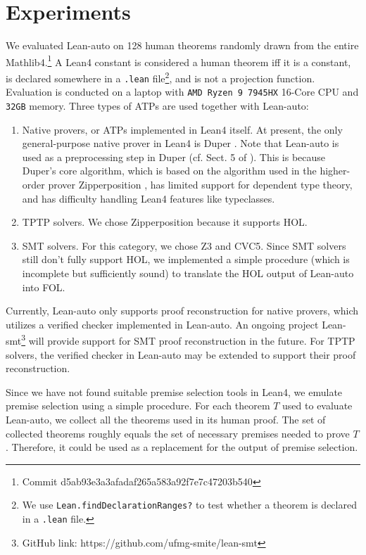 \section{Experiments}\label{sectexpr}

  We evaluated Lean-auto on 128 human theorems randomly drawn from the entire
  Mathlib4.\footnote{Commit d5ab93e3a3afadaf265a583a92f7e7c47203b540} A
  Lean4 constant is considered a human theorem iff it is a constant,
  is declared somewhere in a \texttt{.lean} file\footnote{We use
  \texttt{Lean.findDeclarationRanges?} to test whether a theorem is
  declared in a \texttt{.lean} file.}, and is not a projection function.
  Evaluation is conducted on a laptop
  with \texttt{AMD Ryzen 9 7945HX} 16-Core CPU and \texttt{32GB} memory.
  Three types of ATPs are used together with Lean-auto:
  \begin{enumerate}
    \item Native provers, or ATPs implemented in Lean4 itself. At present, the only general-purpose
      native prover in Lean4 is Duper \cite{DuperPaper}. Note that Lean-auto is
      used as a preprocessing step in Duper (cf. Sect. 5 of \cite{DuperPaper}).
      This is because Duper's core algorithm, which is based on the algorithm used
      in the higher-order prover Zipperposition \cite{ZipperpositionMakeWork}, has limited support for dependent
      type theory, and has difficulty handling Lean4 features like typeclasses.
    \item TPTP solvers. We chose Zipperposition because it supports HOL.
    \item SMT solvers. For this category, we chose Z3 and CVC5. Since SMT solvers
      still don't fully support HOL, we implemented a simple procedure
      (which is incomplete but sufficiently sound) to translate the HOL output of Lean-auto into FOL.
  \end{enumerate}

  Currently, Lean-auto only supports proof reconstruction for native provers,
  which utilizes a verified checker implemented in Lean-auto. An
  ongoing project Lean-smt\footnote{GitHub link: https://github.com/ufmg-smite/lean-smt}
  will provide support for SMT proof reconstruction in the future. For TPTP solvers,
  the verified checker in Lean-auto may be extended to support their proof reconstruction.

  Since we have not found suitable premise selection tools in Lean4, we emulate
  premise selection using a simple procedure. For each theorem $T$ used to evaluate
  Lean-auto, we collect all the theorems used in its human proof. The set of collected theorems
  roughly equals the set of necessary premises needed to prove $T$. Therefore, it could
  be used as a replacement for the output of premise selection.

